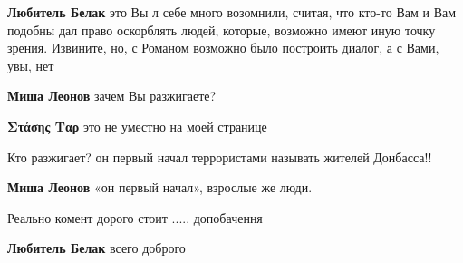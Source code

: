 \begin{itemize}
\begin{itemize}
\textbf{Любитель Белак} это Вы л себе много возомнили, считая, что кто-то Вам и
Вам подобны дал право оскорблять людей, которые, возможно имеют иную точку
зрения. Извините, но, с Романом возможно было построить диалог, а с Вами, увы,
нет

 
\textbf{Миша Леонов} зачем Вы разжигаете?

 
\textbf{Στάσης Ταρ} это не уместно на моей странице

 
Кто разжигает? он первый начал террористами называть жителей Донбасса!!

 
\textbf{Миша Леонов} «он первый начал», взрослые же люди.

 
Реально комент дорого стоит ..... допобачення

 
\textbf{Любитель Белак} всего доброго


\end{itemize}
\end{itemize}
